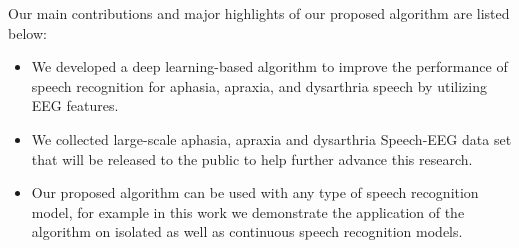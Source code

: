 \documentclass[letterpaper, 10 pt, conference]{ieeeconf}  %
\begin{document}
Our main contributions and major highlights of our proposed algorithm are listed below:
\begin{itemize}
    \item We developed a deep learning-based algorithm to improve the performance of speech recognition for aphasia, apraxia, and dysarthria speech by utilizing EEG features. 
    \item We collected large-scale aphasia, apraxia and dysarthria Speech-EEG data set that will be released to the public to help further advance this research.  
    \item Our proposed algorithm can be used with any type of speech recognition model, for example in this work we demonstrate the application of the algorithm on isolated as well as continuous speech recognition models. 
\end{itemize}
\end{document}
